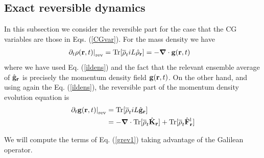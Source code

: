\documentclass[a4paper,openright,12pt]{book}
\begin{document}
\subsection{Exact reversible dynamics}
In this subsection we consider the reversible part for the case that the CG variables are those in Eqs. (\ref{CGvar}).
For the mass density we have
\begin{align}
\left.\partial_t \rho({\bf r},t)\right|_{\rm rev}
&=  {\rm Tr}[\overline{\rho}_t  iL\hat{\rho}_{\bf r}] 
=-\boldsymbol{\nabla}\cdot {\bf  g}({\bf r},t)
\label{conrho}
\end{align}
where we have used Eq. (\ref{ildens}) and the fact that the relevant
ensemble average of $\hat{\bf g}_{\bf  r}$ is precisely  the momentum
density field ${\bf g}({\bf r},t)$.  On the other hand, and using again the Eq. (\ref{ildens}), the reversible
part of the momentum density evolution equation is
\begin{align}
\left.\partial_t {\bf g}({\bf r},t)\right|_{\rm rev}
&=  {\rm Tr}[\overline{\rho}_t  iL\hat{{\bf g}}_{\bf r}] 
\nonumber\\
&=-\boldsymbol{\nabla}\cdot  {\rm Tr}[\overline{\rho}_t \hat{{\bf K}}_{\bf r}] 
+  {\rm Tr}[\overline{\rho}_t  \hat{\bf F}^{\rm l}_{\bf r}]
\label{grev1}
\end{align}

We will compute the terms of Eq. (\ref{grev1}) taking advantage of the Galilean operator. 
\end{document}
